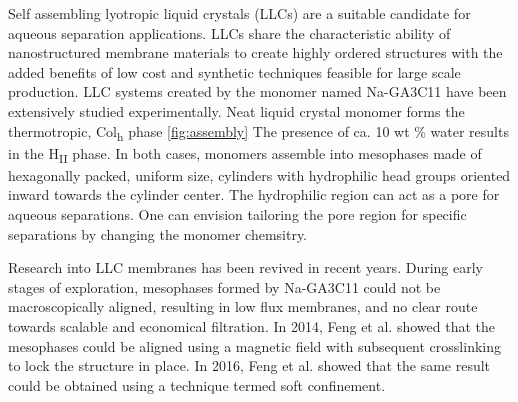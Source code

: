 \documentclass{article}
\begin{document}
  Self assembling lyotropic liquid crystals (LLCs) are a suitable candidate for
  aqueous separation applications. LLCs share the characteristic ability of
  nanostructured membrane materials to create highly ordered structures with the
  added benefits of low cost and synthetic techniques feasible for large scale
  production.  \cite{feng_scalable_2014} LLC systems created by the monomer named
  Na-GA3C11 have been extensively studied experimentally.
  \cite{smith_ordered_1997,zhou_supported_2005,resel_h2-phase_2000,feng_scalable_2014,feng_thin_2016}
  Neat liquid crystal monomer forms the thermotropic, Col\textsubscript{h}
  phase \ref{fig:assembly} The presence of ca. 10 wt \% water results in the
  H\textsubscript{II} phase. In both cases, monomers assemble into mesophases
  made of hexagonally packed, uniform size, cylinders with hydrophilic head
  groups oriented inward towards the cylinder center.  The hydrophilic region can
  act as a pore for aqueous separations.  One can envision tailoring the pore
  region for specific separations by changing the monomer chemsitry.

  Research into LLC membranes has been revived in recent years.  During early
  stages of exploration, mesophases formed by Na-GA3C11 could not be
  macroscopically aligned, resulting in low flux membranes, and no clear route
  towards scalable and economical filtration. In 2014, Feng et al. showed that
  the mesophases could be aligned using a magnetic field with subsequent
  crosslinking to lock the structure in place. \cite{feng_scalable_2014} In 2016,
  Feng et al. showed that the same result could be obtained using a technique
  termed soft confinement. \cite{feng_thin_2016}

\end{document}
